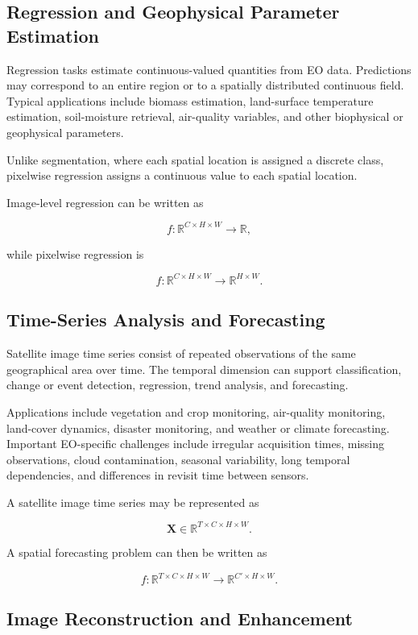 \documentclass[
    11pt,
    a4paper,
    parskip=half,
    bibliography=totoc,
    numbers=noenddot
]{scrartcl}
\begin{document}
\subsection{Regression and Geophysical Parameter Estimation}

Regression tasks estimate continuous-valued quantities from EO data.
Predictions may correspond to an entire region or to a spatially
distributed continuous field. Typical applications include biomass
estimation, land-surface temperature estimation, soil-moisture retrieval,
air-quality variables, and other biophysical or geophysical parameters.

Unlike segmentation, where each spatial location is assigned a discrete
class, pixelwise regression assigns a continuous value to each spatial
location.

Image-level regression can be written as

\[
f:
\mathbb{R}^{C\times H\times W}
\rightarrow
\mathbb{R},
\]

while pixelwise regression is

\[
f:
\mathbb{R}^{C\times H\times W}
\rightarrow
\mathbb{R}^{H\times W}.
\]

\subsection{Time-Series Analysis and Forecasting}

Satellite image time series consist of repeated observations of the same
geographical area over time. The temporal dimension can support
classification, change or event detection, regression, trend analysis,
and forecasting.

Applications include vegetation and crop monitoring, air-quality
monitoring, land-cover dynamics, disaster monitoring, and weather or
climate forecasting. Important EO-specific challenges include irregular
acquisition times, missing observations, cloud contamination, seasonal
variability, long temporal dependencies, and differences in revisit time
between sensors.

A satellite image time series may be represented as

\[
\mathbf{X}
\in
\mathbb{R}^{T\times C\times H\times W}.
\]

A spatial forecasting problem can then be written as

\[
f:
\mathbb{R}^{T\times C\times H\times W}
\rightarrow
\mathbb{R}^{C'\times H\times W}.
\]

\subsection{Image Reconstruction and Enhancement}
\end{document}

